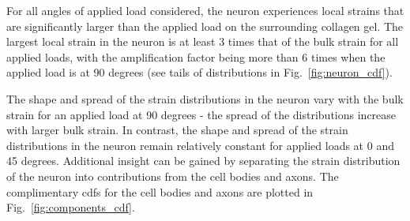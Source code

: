 \documentclass[10pt]{asme2ej}
\begin{document}
%
For all angles of applied load considered, the neuron experiences local strains that are significantly larger than the applied load on the surrounding collagen gel. The largest local strain in the neuron is at least 3 times that of the bulk strain for all applied loads, with the amplification factor being more than 6 times when the applied load is at 90 degrees (see tails of distributions in Fig.\ \ref{fig:neuron_cdf}).

The shape and spread of the strain distributions in the neuron vary with the bulk strain for an applied load at 90 degrees - the spread of the distributions increase with larger bulk strain. In contrast, the shape and spread of the strain distributions in the neuron remain relatively constant for applied loads at 0 and 45 degrees. Additional insight can be gained by separating the strain distribution of the neuron into contributions from the cell bodies and axons. The complimentary cdfs for the cell bodies and axons are plotted in Fig.\ \ref{fig:components_cdf}.
%
\end{document}
